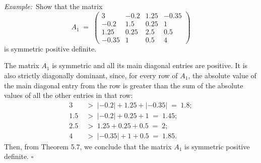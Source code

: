 \par\medskip\noindent\textit{Example:}\ Show that the matrix
\[
A_1 \;=\; \begin{pmatrix}
3 & -0.2 & 1.25 & -0.35\\
-0.2 & 1.5 & 0.25 & 1\\
1.25 & 0.25 & 2.5 & 0.5\\
-0.35 & 1 & 0.5 & 4
\end{pmatrix}
\]
is symmetric positive definite.

\begin{answerx}
The matrix $A_1$ is symmetric and all its main diagonal entries are positive. It is
also strictly diagonally dominant, since, for every row of $A_1$, the absolute value of
the main diagonal entry from the row is greater than the sum of the absolute values of
all the other entries in that row:
\begin{align*}
3 \;&>\; |-0.2| + 1.25 + |-0.35| \;=\; 1.8;\\
1.5 \;&>\; |-0.2| + 0.25 + 1 \;=\; 1.45;\\
2.5 \;&>\; 1.25 + 0.25 + 0.5 \;=\; 2;\\
4 \;&>\; |-0.35| + 1 + 0.5 \;=\; 1.85.
\end{align*}
Then, from Theorem 5.7, we conclude that the matrix $A_1$ is symmetric positive
definite. \hfill$\square$
\end{answerx}
